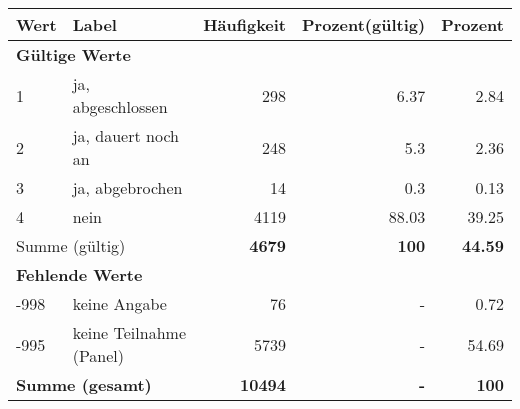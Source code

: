      \begin{longtable}{lXrrr}
     \toprule
     \textbf{Wert} & \textbf{Label} & \textbf{Häufigkeit} & \textbf{Prozent(gültig)} & \textbf{Prozent} \\
     \endhead
     \midrule
     \multicolumn{5}{l}{\textbf{Gültige Werte}}\\

     1 &
     \multicolumn{1}{X}{ ja, abgeschlossen   } &


       \num{298} &
       \num[round-mode=places,round-precision=2]{6.37} &
         \num[round-mode=places,round-precision=2]{2.84} \\

     2 &
     \multicolumn{1}{X}{ ja, dauert noch an   } &


       \num{248} &
       \num[round-mode=places,round-precision=2]{5.3} &
         \num[round-mode=places,round-precision=2]{2.36} \\

     3 &
     \multicolumn{1}{X}{ ja, abgebrochen   } &


       \num{14} &
       \num[round-mode=places,round-precision=2]{0.3} &
         \num[round-mode=places,round-precision=2]{0.13} \\

     4 &
     \multicolumn{1}{X}{ nein   } &


       \num{4119} &
       \num[round-mode=places,round-precision=2]{88.03} &
         \num[round-mode=places,round-precision=2]{39.25} \\
     \midrule
     \multicolumn{2}{l}{Summe (gültig)} &
       \textbf{\num{4679}} &
     \textbf{\num{100}} &
       \textbf{\num[round-mode=places,round-precision=2]{44.59}} \\
     \multicolumn{5}{l}{\textbf{Fehlende Werte}}\\
       -998 &
       keine Angabe &
         \num{76} &
        - &
         \num[round-mode=places,round-precision=2]{0.72} \\
       -995 &
       keine Teilnahme (Panel) &
         \num{5739} &
        - &
         \num[round-mode=places,round-precision=2]{54.69} \\
     \midrule
     \multicolumn{2}{l}{\textbf{Summe (gesamt)}} &
          \textbf{\num{10494}} &
        \textbf{-} &
        \textbf{\num{100}} \\
     \bottomrule
     \end{longtable}
     
